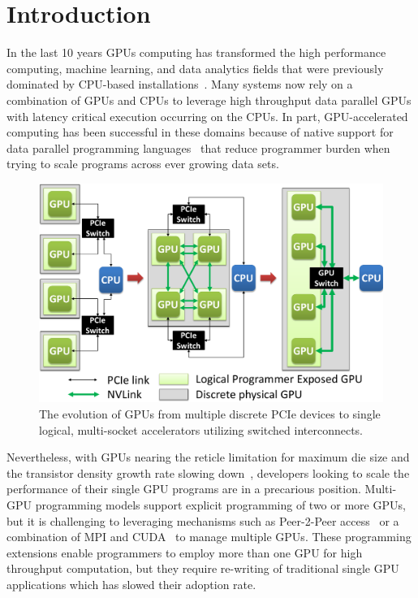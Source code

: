 \section{Introduction}
\label{introduction}

In the last 10 years GPUs computing has transformed the high performance 
computing, machine learning, and data analytics fields that were previously 
dominated by CPU-based 
installations~\cite{intersect360,cudnn,Lavin15b,SimonyanZ14a}. Many systems now 
rely on a combination of GPUs and CPUs to leverage high throughput data parallel 
GPUs with latency critical execution occurring on the CPUs. In part, 
GPU-accelerated computing has been successful in these domains because of native 
support for data parallel programming languages~\cite{CUDA7,OPENCL} that reduce 
programmer burden when trying to scale programs across ever growing data sets.

\begin{figure}[t]
\centering
\includegraphics[width=1.0\columnwidth]{figures/inter_gpu_connections.pdf}
\caption{The evolution of GPUs from multiple discrete PCIe devices to 
single logical, multi-socket accelerators utilizing switched interconnects.}
\label{fig:systemdiagram}
\vspace{-.2in}
\end{figure}

Nevertheless, with GPUs nearing the reticle limitation for maximum die size and 
the transistor density growth rate slowing down~\cite{mooredead2016}, developers 
looking to scale the performance of their single GPU programs are in a 
precarious position. Multi-GPU programming models support explicit programming 
of two or more GPUs, but it is challenging to leveraging mechanisms such as 
Peer-2-Peer access~\cite{NVIDIAP2P} or a combination of MPI and 
CUDA~\cite{NVIDIAMPI} to manage multiple GPUs. These programming extensions 
enable programmers to employ more than one GPU for high throughput computation, 
but they require re-writing of traditional single GPU applications which has 
slowed their adoption rate.

